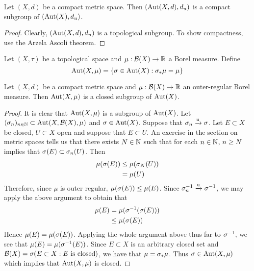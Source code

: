 \documentclass{book}
\begin{document}
	\begin{ex} \lex{}
	Let $(X, d)$ be a compact metric space. Then $(\operatorname{Aut}(X, d), d_u)$ is a compact subgroup of $(\operatorname{Aut}(X), d_u)$.
	\end{ex}
	
	\begin{proof}
	Clearly, $(\operatorname{Aut}(X, d), d_u)$ is a topological subgroup. To show compactness, use the Arzela Ascoli theorem.
	\end{proof}
	
	\begin{defn} \ld{}
	Let $(X, \tau)$ be a topological space and $\mu: \mathcal{B}(X) \rightarrow \mathbb{R}$ a Borel measure. Define $$\operatorname{Aut}(X, \mu) = \{\sigma \in \operatorname{Aut}(X): \sigma_* \mu = \mu\}$$ 
	\end{defn}	
	
	\begin{ex} \lex{}
	Let $(X,d)$ be a compact metric space and $\mu: \mathcal{B}(X) \rightarrow \mathbb{R}$ an outer-regular Borel measure. Then $\operatorname{Aut}(X, \mu)$ is a closed subgroup of $\operatorname{Aut}(X)$.
	\end{ex}
	
	\begin{proof}
	It is clear that $\operatorname{Aut}(X, \mu)$ is a subgroup of $\operatorname{Aut}(X)$. Let $(\sigma_n)_{n \in \mathbb{N}} \subset \operatorname{Aut}(X, \mathcal{B}(X), \mu)$ and $\sigma \in \operatorname{Aut}(X)$. Suppose that $\sigma_n \xrightarrow{\text{u}} \sigma$. Let $E \subset X$ be closed, $U \subset X$ open and suppose that $E \subset U$. An exercise in the section on metric spaces tells us that there exists $N \in \mathbb{N}$ such that for each $n \in \mathbb{N}$, $n \geq N$ implies that $\sigma(E) \subset \sigma_n(U)$. Then 
	\begin{align*}
	\mu(\sigma(E)) 
	&\leq \mu(\sigma_N(U)) \\
	&= \mu(U) 
	\end{align*}
	Therefore, since $\mu$ is outer regular, $\mu(\sigma(E)) \leq \mu(E)$. Since $\sigma_n^{-1} \xrightarrow{\text{u}} \sigma^{-1}$, we may apply the above argument to obtain that 
	\begin{align*}
	\mu(E) 
	&= \mu(\sigma^{-1}(\sigma (E))) \\
	&\leq  \mu(\sigma(E))
\end{align*}	 
Hence $\mu(E) = \mu(\sigma(E))$. Applying the whole argument above thus far to $\sigma^{-1}$, we see that $\mu(E) = \mu(\sigma^{-1}(E))$. Since $E \subset X$ is an arbitrary closed set and $\mathcal{B}(X) = \sigma(E \subset X: E \text{ is closed})$, we have that $\mu = \sigma_*\mu$. Thus $\sigma \in \operatorname{Aut}(X, \mu)$ which implies that $\operatorname{Aut}(X, \mu)$ is closed. 
	\end{proof}
	
\end{document}
